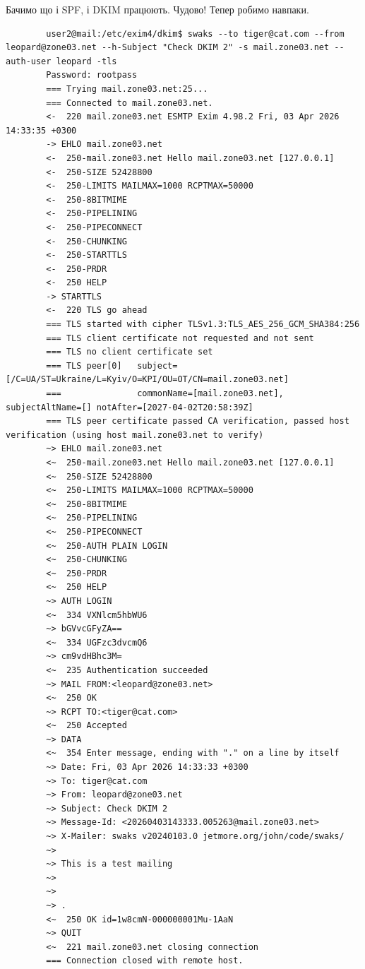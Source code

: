 \documentclass[14pt, a4paper]{extreport}
\begin{document}
	Бачимо що і SPF, і DKIM працюють. Чудово! Тепер робимо навпаки.
	
	\begin{verbatim}
		user2@mail:/etc/exim4/dkim$ swaks --to tiger@cat.com --from leopard@zone03.net --h-Subject "Check DKIM 2" -s mail.zone03.net --auth-user leopard -tls
		Password: rootpass
		=== Trying mail.zone03.net:25...
		=== Connected to mail.zone03.net.
		<-  220 mail.zone03.net ESMTP Exim 4.98.2 Fri, 03 Apr 2026 14:33:35 +0300
		-> EHLO mail.zone03.net
		<-  250-mail.zone03.net Hello mail.zone03.net [127.0.0.1]
		<-  250-SIZE 52428800
		<-  250-LIMITS MAILMAX=1000 RCPTMAX=50000
		<-  250-8BITMIME
		<-  250-PIPELINING
		<-  250-PIPECONNECT
		<-  250-CHUNKING
		<-  250-STARTTLS
		<-  250-PRDR
		<-  250 HELP
		-> STARTTLS
		<-  220 TLS go ahead
		=== TLS started with cipher TLSv1.3:TLS_AES_256_GCM_SHA384:256
		=== TLS client certificate not requested and not sent
		=== TLS no client certificate set
		=== TLS peer[0]   subject=[/C=UA/ST=Ukraine/L=Kyiv/O=KPI/OU=OT/CN=mail.zone03.net]
		===               commonName=[mail.zone03.net], subjectAltName=[] notAfter=[2027-04-02T20:58:39Z]
		=== TLS peer certificate passed CA verification, passed host verification (using host mail.zone03.net to verify)
		~> EHLO mail.zone03.net
		<~  250-mail.zone03.net Hello mail.zone03.net [127.0.0.1]
		<~  250-SIZE 52428800
		<~  250-LIMITS MAILMAX=1000 RCPTMAX=50000
		<~  250-8BITMIME
		<~  250-PIPELINING
		<~  250-PIPECONNECT
		<~  250-AUTH PLAIN LOGIN
		<~  250-CHUNKING
		<~  250-PRDR
		<~  250 HELP
		~> AUTH LOGIN
		<~  334 VXNlcm5hbWU6
		~> bGVvcGFyZA==
		<~  334 UGFzc3dvcmQ6
		~> cm9vdHBhc3M=
		<~  235 Authentication succeeded
		~> MAIL FROM:<leopard@zone03.net>
		<~  250 OK
		~> RCPT TO:<tiger@cat.com>
		<~  250 Accepted
		~> DATA
		<~  354 Enter message, ending with "." on a line by itself
		~> Date: Fri, 03 Apr 2026 14:33:33 +0300
		~> To: tiger@cat.com
		~> From: leopard@zone03.net
		~> Subject: Check DKIM 2
		~> Message-Id: <20260403143333.005263@mail.zone03.net>
		~> X-Mailer: swaks v20240103.0 jetmore.org/john/code/swaks/
		~> 
		~> This is a test mailing
		~> 
		~> 
		~> .
		<~  250 OK id=1w8cmN-000000001Mu-1AaN
		~> QUIT
		<~  221 mail.zone03.net closing connection
		=== Connection closed with remote host.
		

\end{verbatim}
\end{document}
